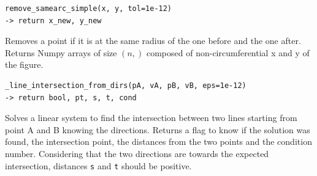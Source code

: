 \begin{verbatim}
remove_samearc_simple(x, y, tol=1e-12)
-> return x_new, y_new
\end{verbatim}
\hspace*{2em} Removes a point if it is at the same radius of the one before and the one after.  Returns Numpy arrays of size $(n,)$ composed of non-circumferential x and y of the figure.

\begin{verbatim}
_line_intersection_from_dirs(pA, vA, pB, vB, eps=1e-12)
-> return bool, pt, s, t, cond
\end{verbatim}
\hspace*{2em} Solves a linear system to find the intersection between two lines starting from point A and B knowing the directions. Returns a flag to know if the solution was found, the intersection point, the distances from the two points and the condition number. Considering that the two directions are towards the expected intersection, distances \verb|s| and \verb|t| should be positive.


